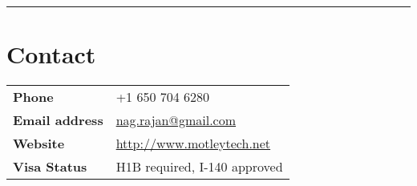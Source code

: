 \documentclass[line, 11pt]{res}
\renewenvironment{resume}{\begingroup}{\endgroup}
\begin{document}
\begin{resume}


\vspace{8pt}
\hrule


\vspace{-3pt}
\section{Contact}
    \vspace{5pt}
    \begin{tabular}{ll}
    \textbf{Phone} & +1 650 704 6280\\
    \textbf{Email address} & \href{mailto:nag.rajan@gmail.com}{nag.rajan@gmail.com}\\
    \textbf{Website} & \href{http://www.motleytech.net}{http://www.motleytech.net}\\
    \textbf{Visa Status} & H1B required, I-140 approved\\
    \end{tabular}


\end{resume}
\end{document}

